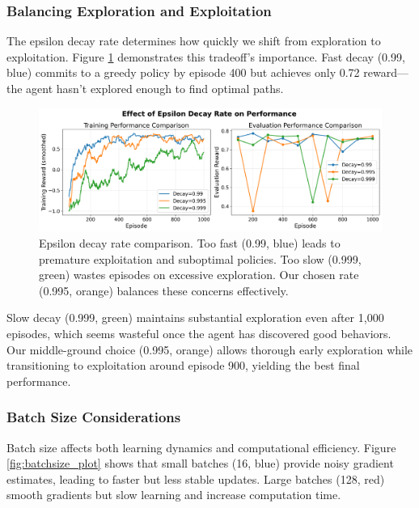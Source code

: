 \documentclass[conference]{IEEEtran}
\begin{document}
\subsubsection{Balancing Exploration and Exploitation}

The epsilon decay rate determines how quickly we shift from exploration to exploitation. Figure \ref{fig:epsilon} demonstrates this tradeoff's importance. Fast decay (0.99, blue) commits to a greedy policy by episode 400 but achieves only 0.72 reward—the agent hasn't explored enough to find optimal paths.

\begin{figure}[htbp]
\centerline{\includegraphics[width=\columnwidth]{images/experiment_epsilon.png}}
\caption{Epsilon decay rate comparison. Too fast (0.99, blue) leads to premature exploitation and suboptimal policies. Too slow (0.999, green) wastes episodes on excessive exploration. Our chosen rate (0.995, orange) balances these concerns effectively.}
\label{fig:epsilon}
\end{figure}

Slow decay (0.999, green) maintains substantial exploration even after 1,000 episodes, which seems wasteful once the agent has discovered good behaviors. Our middle-ground choice (0.995, orange) allows thorough early exploration while transitioning to exploitation around episode 900, yielding the best final performance.

\subsubsection{Batch Size Considerations}

Batch size affects both learning dynamics and computational efficiency. Figure \ref{fig:batchsize_plot} shows that small batches (16, blue) provide noisy gradient estimates, leading to faster but less stable updates. Large batches (128, red) smooth gradients but slow learning and increase computation time.
\end{document}

